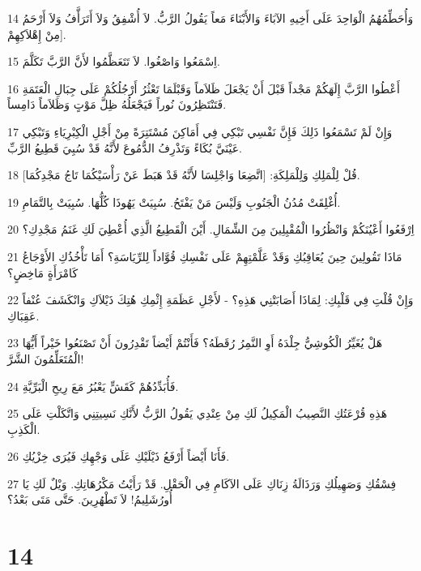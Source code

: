 \par 14 وَأُحَطِّمُهُمُ الْوَاحِدَ عَلَى أَخِيهِ الآبَاءَ وَالأَبْنَاءَ مَعاً يَقُولُ الرَّبُّ. لاَ أُشْفِقُ وَلاَ أَتَرَأَّفُ وَلاَ أَرْحَمُ مِنْ إِهْلاَكِهِمْ].
\par 15 اِسْمَعُوا وَاصْغُوا. لاَ تَتَعَظَّمُوا لأَنَّ الرَّبَّ تَكَلَّمَ.
\par 16 أَعْطُوا الرَّبَّ إِلَهَكُمْ مَجْداً قَبْلَ أَنْ يَجْعَلَ ظَلاَماً وَقَبْلَمَا تَعْثُرُ أَرْجُلُكُمْ عَلَى جِبَالِ الْعَتَمَةِ فَتَنْتَظِرُونَ نُوراً فَيَجْعَلُهُ ظِلَّ مَوْتٍ وَظَلاَماً دَامِساً.
\par 17 وَإِنْ لَمْ تَسْمَعُوا ذَلِكَ فَإِنَّ نَفْسِي تَبْكِي فِي أَمَاكِنَ مُسْتَتِرَةً مِنْ أَجْلِ الْكِبْرِيَاءِ وَتَبْكِي عَيْنَيَّ بُكَاءً وَتَذْرِفُ الدُّمُوعَ لأَنَّهُ قَدْ سُبِيَ قَطِيعُ الرَّبِّ.
\par 18 قُلْ لِلْمَلِكِ وَلِلْمَلِكَةِ: [اتَّضِعَا وَاجْلِسَا لأَنَّهُ قَدْ هَبَطَ عَنْ رَأْسَيْكُمَا تَاجُ مَجْدِكُمَا].
\par 19 أُغْلِقَتْ مُدُنُ الْجَنُوبِ وَلَيْسَ مَنْ يَفْتَحُ. سُبِيَتْ يَهُوذَا كُلُّهَا. سُبِيَتْ بِالتَّمَامِ.
\par 20 اِرْفَعُوا أَعْيُنَكُمْ وَانْظُرُوا الْمُقْبِلِينَ مِنَ الشِّمَالِ. أَيْنَ الْقَطِيعُ الَّذِي أُعْطِيَ لَكِ غَنَمُ مَجْدِكِ؟
\par 21 مَاذَا تَقُولِينَ حِينَ يُعَاقِبُكِ وَقَدْ عَلَّمْتِهِمْ عَلَى نَفْسِكِ قُوَّاداً لِلرِّيَاسَةِ؟ أَمَا تَأْخُذُكِ الأَوْجَاعُ كَامْرَأَةٍ مَاخِضٍ؟
\par 22 وَإِنْ قُلْتِ فِي قَلْبِكِ: لِمَاذَا أَصَابَتْنِي هَذِهِ؟ - لأَجْلِ عَظَمَةِ إِثْمِكِ هُتِكَ ذَيْلاَكِ وَانْكَشَفَ عُنْفاً عَقِبَاكِ.
\par 23 هَلْ يُغَيِّرُ الْكُوشِيُّ جِلْدَهُ أَوِ النَّمِرُ رُقَطَهُ؟ فَأَنْتُمْ أَيْضاً تَقْدِرُونَ أَنْ تَصْنَعُوا خَيْراً أَيُّهَا الْمُتَعَلِّمُونَ الشَّرَّ!
\par 24 فَأُبَدِّدُهُمْ كَقَشٍّ يَعْبُرُ مَعَ رِيحِ الْبَرِّيَّةِ.
\par 25 هَذِهِ قُرْعَتُكِ النَّصِيبُ الْمَكِيلُ لَكِ مِنْ عِنْدِي يَقُولُ الرَّبُّ لأَنَّكِ نَسِيتِنِي وَاتَّكَلْتِ عَلَى الْكَذِبِ.
\par 26 فَأَنَا أَيْضاً أَرْفَعُ ذَيْلَيْكِ عَلَى وَجْهِكِ فَيُرَى خِزْيُكِ.
\par 27 فِسْقُكِ وَصَهِيلُكِ وَرَذَالَةُ زِنَاكِ عَلَى الآكَامِ فِي الْحَقْلِ. قَدْ رَأَيْتُ مَكْرُهَاتِكِ. وَيْلٌ لَكِ يَا أُورُشَلِيمُ! لاَ تَطْهُرِينَ. حَتَّى مَتَى بَعْدُ؟

\chapter{14}

